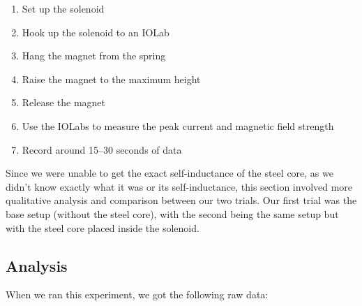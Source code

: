 \documentclass[11pt]{article}
\begin{document}
    \begin{enumerate}
        \item Set up the solenoid
        \item Hook up the solenoid to an IOLab
        \item Hang the magnet from the spring
        \item Raise the magnet to the maximum height
        \item Release the magnet
        \item Use the IOLabs to measure the peak current and magnetic field strength
        \item Record around 15--30 seconds of data
    \end{enumerate}

    Since we were unable to get the exact self-inductance of the steel core, as we didn't know exactly what it was or its self-inductance, this section involved more qualitative analysis and comparison between our two trials. Our first trial was the base setup (without the steel core), with the second being the same setup but with the steel core placed inside the solenoid.

    \subsection{Analysis}\label{subsec:part_3_analsysis}
    When we ran this experiment, we got the following raw data:
\end{document}
